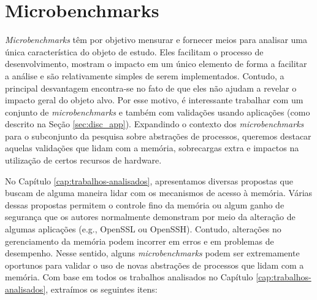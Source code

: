

\section{Microbenchmarks}
\label{sec:micro}

\textit{Microbenchmarks} têm por objetivo mensurar e fornecer meios para
analisar uma única característica do objeto de estudo. Eles
facilitam o processo de desenvolvimento,
mostram o impacto em um único elemento de forma a facilitar a análise e são
relativamente simples de serem implementados. Contudo, a principal desvantagem
encontra-se no fato de que eles não ajudam a revelar o impacto geral do objeto
alvo. Por esse motivo, é interessante trabalhar com um conjunto de
\textit{microbenchmarks} e também com validações usando aplicações (como
descrito na Seção \ref{sec:disc_app}). Expandindo o contexto dos
\textit{microbenchmarks} para o subconjunto da pesquisa sobre abstrações de
processos, queremos destacar aquelas validações que lidam com a memória,
sobrecargas extra e impactos na utilização de certos recursos de hardware.

No Capítulo \ref{cap:trabalhos-analisados}, apresentamos diversas propostas que
buscam de alguma maneira lidar com os mecanismos de acesso à memória. Várias
dessas propostas permitem o controle fino da memória ou algum ganho de
segurança que os autores normalmente demonstram por meio da alteração de
algumas aplicações (e.g., OpenSSL ou OpenSSH). Contudo, alterações no
gerenciamento da memória podem incorrer em erros e em problemas de desempenho.
Nesse sentido, alguns \textit{microbenchmarks} podem ser extremamente oportunos
para validar o uso de novas abstrações de processos que lidam com a memória.
Com base em todos os trabalhos analisados no Capítulo
\ref{cap:trabalhos-analisados}, extraímos os seguintes itens:

